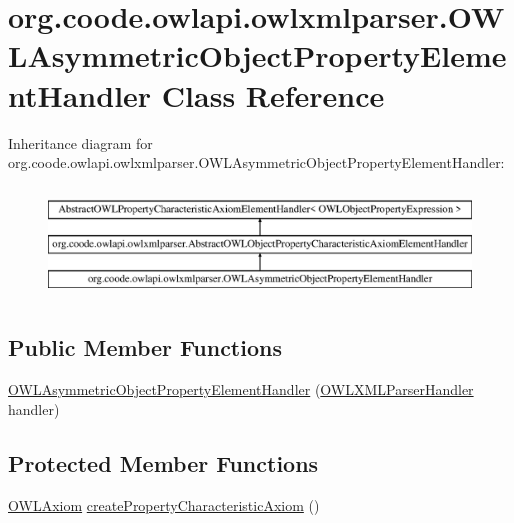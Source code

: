 \hypertarget{classorg_1_1coode_1_1owlapi_1_1owlxmlparser_1_1_o_w_l_asymmetric_object_property_element_handler}{\section{org.\-coode.\-owlapi.\-owlxmlparser.\-O\-W\-L\-Asymmetric\-Object\-Property\-Element\-Handler Class Reference}
\label{classorg_1_1coode_1_1owlapi_1_1owlxmlparser_1_1_o_w_l_asymmetric_object_property_element_handler}
}
Inheritance diagram for org.\-coode.\-owlapi.\-owlxmlparser.\-O\-W\-L\-Asymmetric\-Object\-Property\-Element\-Handler\-:\begin{figure}[H]
\begin{center}
\leavevmode
\includegraphics[height=2.984014cm]{classorg_1_1coode_1_1owlapi_1_1owlxmlparser_1_1_o_w_l_asymmetric_object_property_element_handler}
\end{center}
\end{figure}
\subsection*{Public Member Functions}
\begin{DoxyCompactItemize}
\item 
\hyperlink{classorg_1_1coode_1_1owlapi_1_1owlxmlparser_1_1_o_w_l_asymmetric_object_property_element_handler_a0fc8c834b043b01d7bc7bbc4ef3c1882}{O\-W\-L\-Asymmetric\-Object\-Property\-Element\-Handler} (\hyperlink{classorg_1_1coode_1_1owlapi_1_1owlxmlparser_1_1_o_w_l_x_m_l_parser_handler}{O\-W\-L\-X\-M\-L\-Parser\-Handler} handler)
\end{DoxyCompactItemize}
\subsection*{Protected Member Functions}
\begin{DoxyCompactItemize}
\item 
\hyperlink{interfaceorg_1_1semanticweb_1_1owlapi_1_1model_1_1_o_w_l_axiom}{O\-W\-L\-Axiom} \hyperlink{classorg_1_1coode_1_1owlapi_1_1owlxmlparser_1_1_o_w_l_asymmetric_object_property_element_handler_adc219dd43159972d2958f5b3b1b7f688}{create\-Property\-Characteristic\-Axiom} ()
\end{DoxyCompactItemize}


